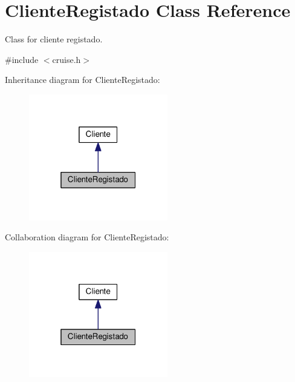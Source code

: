 \hypertarget{classClienteRegistado}{}\section{Cliente\+Registado Class Reference}
\label{classClienteRegistado}


Class for cliente registado.  




{\ttfamily \#include $<$cruise.\+h$>$}



Inheritance diagram for Cliente\+Registado\+:\nopagebreak
\begin{figure}[H]
\begin{center}
\leavevmode
\includegraphics[width=172pt]{classClienteRegistado__inherit__graph}
\end{center}
\end{figure}


Collaboration diagram for Cliente\+Registado\+:\nopagebreak
\begin{figure}[H]
\begin{center}
\leavevmode
\includegraphics[width=172pt]{classClienteRegistado__coll__graph}
\end{center}
\end{figure}
